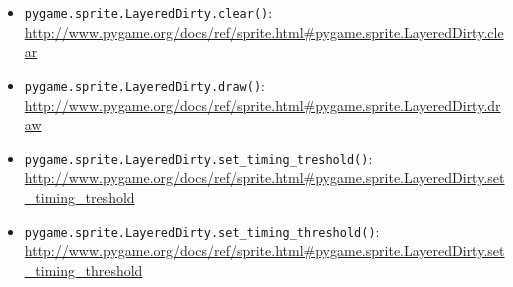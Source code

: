 \begin{itemize}
	\item \texttt{pygame.sprite.LayeredDirty.clear()}:
	\\ \url{http://www.pygame.org/docs/ref/sprite.html#pygame.sprite.LayeredDirty.clear}
	
	\item \texttt{pygame.sprite.LayeredDirty.draw()}:
	\\ \url{http://www.pygame.org/docs/ref/sprite.html#pygame.sprite.LayeredDirty.draw}

	\item \texttt{pygame.sprite.LayeredDirty.set\_timing\_treshold()}:
	\\ \url{http://www.pygame.org/docs/ref/sprite.html#pygame.sprite.LayeredDirty.set\_timing\_treshold}

	\item \texttt{pygame.sprite.LayeredDirty.set\_timing\_threshold()}:
	\\ \url{http://www.pygame.org/docs/ref/sprite.html#pygame.sprite.LayeredDirty.set\_timing\_threshold}


\end{itemize}

